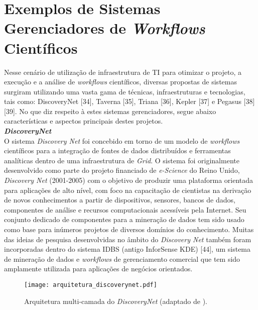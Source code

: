 \section{Exemplos de Sistemas Gerenciadores de \textit{Workflows} Científicos} \label{cap3sec4}

Nesse cenário de utilização de infraestrutura de TI para otimizar o projeto, a execução e a análise de \textit{workflows} científicos, diversas propostas de sistemas surgiram utilizando uma vasta gama de técnicas, infraestruturas e tecnologias, tais como: DiscoveryNet [34], Taverna [35], Triana [36], Kepler [37] e Pegasus [38][39]. No que diz respeito à estes sistemas gerenciadores, segue abaixo características e aspectos principais destes projetos. \\


\noindent
\textbf{\textit{DiscoveryNet}} \\

\noindent
O sistema \textit{Discovery Net} foi concebido em torno de um modelo de \textit{workflows} científicos para a integração de fontes de dados distribuídos e ferramentas analíticas dentro de uma infraestrutura de \textit{Grid}. O sistema foi originalmente desenvolvido como parte do projeto financiado de \textit{e-Science} do Reino Unido, \textit{Discovery Net} (2001-2005) com o objetivo de produzir uma plataforma orientada para aplicações de alto nível, com foco na capacitação de cientistas na derivação de novos conhecimentos a partir de dispositivos, sensores, bancos de dados, componentes de análise e recursos computacionais acessíveis pela Internet. Seu conjunto dedicado de componentes para a mineração de dados tem sido usado como base para inúmeros projetos de diversos domínios do conhecimento. Muitas das ideias de pesquisa desenvolvidas no âmbito do \textit{Discovery Net} também foram incorporadas dentro do sistema IDBS (antigo InforSense KDE) [44], um sistema de mineração de dados e \textit{workflows} de gerenciamento comercial que tem sido amplamente utilizada para aplicações de negócios orientados. 
    
\begin{figure}[ht]
	\centering
	\texttt{[image: arquitetura\_discoverynet.pdf]}
	\caption{Arquitetura multi-camada do \textit{DiscoveryNet} (adaptado de \cite{can_one_size_fit_all}).}
	\label{fig:arquitetura_discoverynet}
\end{figure}  
    
